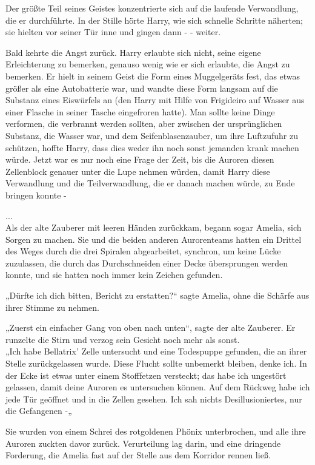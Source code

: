 {Der größte Teil seines Geistes konzentrierte sich auf die laufende Verwandlung, die er durchführte. In der Stille hörte Harry, wie sich schnelle Schritte näherten; sie hielten vor seiner Tür inne und gingen dann - - weiter.

Bald kehrte die Angst zurück. Harry erlaubte sich nicht, seine eigene Erleichterung zu bemerken, genauso wenig wie er sich erlaubte, die Angst zu bemerken. Er hielt in seinem Geist die Form eines Muggelgeräts fest, das etwas größer als eine Autobatterie war, und wandte diese Form langsam auf die Substanz eines Eiswürfels an (den Harry mit Hilfe von Frigideiro auf Wasser aus einer Flasche in seiner Tasche eingefroren hatte). Man sollte keine Dinge verformen, die verbrannt werden sollten, aber zwischen der ursprünglichen Substanz, die Wasser war, und dem Seifenblasenzauber, um ihre Luftzufuhr zu schützen, hoffte Harry, dass dies weder ihn noch sonst jemanden krank machen würde. Jetzt war es nur noch eine Frage der Zeit, bis die Auroren diesen Zellenblock genauer unter die Lupe nehmen würden, damit Harry diese Verwandlung und die Teilverwandlung, die er danach machen würde, zu Ende bringen konnte -

...\\ Als der alte Zauberer mit leeren Händen zurückkam, begann sogar Amelia, sich Sorgen zu machen. Sie und die beiden anderen Aurorenteams hatten ein Drittel des Weges durch die drei Spiralen abgearbeitet, synchron, um keine Lücke zuzulassen, die durch das Durchschneiden einer Decke übersprungen werden konnte, und sie hatten noch immer kein Zeichen gefunden.

„Dürfte ich dich bitten, Bericht zu erstatten?“ sagte Amelia, ohne die Schärfe aus ihrer Stimme zu nehmen.

„Zuerst ein einfacher Gang von oben nach unten“, sagte der alte Zauberer. Er runzelte die Stirn und verzog sein Gesicht noch mehr als sonst.\\ „Ich habe Bellatrix' Zelle untersucht und eine Todespuppe gefunden, die an ihrer Stelle zurückgelassen wurde. Diese Flucht sollte unbemerkt bleiben, denke ich. In der Ecke ist etwas unter einem Stofffetzen versteckt; das habe ich ungestört gelassen, damit deine Auroren es untersuchen können. Auf dem Rückweg habe ich jede Tür geöffnet und in die Zellen gesehen. Ich sah nichts Desillusioniertes, nur die Gefangenen -„

Sie wurden von einem Schrei des rotgoldenen Phönix unterbrochen, und alle ihre Auroren zuckten davor zurück. Verurteilung lag darin, und eine dringende Forderung, die Amelia fast auf der Stelle aus dem Korridor rennen ließ.

}
